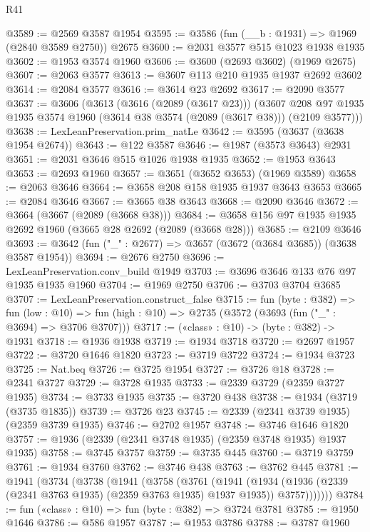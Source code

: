 \begin{lexlean}{R41}
\begin{coremodule}
{{{{{{{{{{{{{{{{{{{{{{{{{{{{{{{{{{{{{{{{{{{{{{{{{{{{{{{{{{{{{{{{{{{{{{{{{{{{{{{{{{{{{{{@3589 := @2569 @3587 @1954
@3595 := @3586 (fun (__b : @1931) => @1969 (@2840 @3589 @2750)) @2675
@3600 := @2031 @3577 @515 @1023 @1938 @1935
@3602 := @1953 @3574 @1960
@3606 := @3600 (@2693 @3602) (@1969 @2675)
@3607 := @2063 @3577
@3613 := @3607 @113 @210 @1935 @1937 @2692 @3602
@3614 := @2084 @3577
@3616 := @3614 @23 @2692
@3617 := @2090 @3577
@3637 := @3606
    (@3613
      (@3616 (@2089 (@3617 @23)))
      (@3607 @208 @97 @1935 @1935 @3574 @1960 (@3614 @38 @3574 (@2089 (@3617 @38))) (@2109 @3577)))
@3638 := LexLeanPreservation.prim_natLe
@3642 := @3595 (@3637 (@3638 @1954 @2674))
@3643 := @122 @3587
@3646 := @1987 (@3573 @3643) @2931
@3651 := @2031 @3646 @515 @1026 @1938 @1935
@3652 := @1953 @3643
@3653 := @2693 @1960
@3657 := @3651 (@3652 @3653) (@1969 @3589)
@3658 := @2063 @3646
@3664 := @3658 @208 @158 @1935 @1937 @3643 @3653
@3665 := @2084 @3646
@3667 := @3665 @38 @3643
@3668 := @2090 @3646
@3672 := @3664 (@3667 (@2089 (@3668 @38)))
@3684 := @3658 @156 @97 @1935 @1935 @2692 @1960 (@3665 @28 @2692 (@2089 (@3668 @28)))
@3685 := @2109 @3646
@3693 := @3642 (fun ("_" : @2677) => @3657 (@3672 (@3684 @3685)) (@3638 @3587 @1954))
@3694 := @2676 @2750
@3696 := LexLeanPreservation.conv_build @1949
@3703 := @3696 @3646 @133 @76 @97 @1935 @1935 @1960
@3704 := @1969 @2750
@3706 := @3703 @3704 @3685
@3707 := LexLeanPreservation.construct_false
@3715 := fun (byte : @382) =>
  fun (low : @10) => fun (high : @10) => @2735 (@3572 (@3693 (fun ("_" : @3694) => @3706 @3707)))
@3717 := («class» : @10) -> (byte : @382) -> @1931
@3718 := @1936 @1938
@3719 := @1934 @3718
@3720 := @2697 @1957
@3722 := @3720 @1646 @1820
@3723 := @3719 @3722
@3724 := @1934 @3723
@3725 := Nat.beq
@3726 := @3725 @1954
@3727 := @3726 @18
@3728 := @2341 @3727
@3729 := @3728 @1935
@3733 := @2339 @3729 (@2359 @3727 @1935)
@3734 := @3733 @1935
@3735 := @3720 @438
@3738 := @1934 (@3719 (@3735 @1835))
@3739 := @3726 @23
@3745 := @2339 (@2341 @3739 @1935) (@2359 @3739 @1935)
@3746 := @2702 @1957
@3748 := @3746 @1646 @1820
@3757 := @1936 (@2339 (@2341 @3748 @1935) (@2359 @3748 @1935) @1937 @1935)
@3758 := @3745 @3757
@3759 := @3735 @445
@3760 := @3719 @3759
@3761 := @1934 @3760
@3762 := @3746 @438
@3763 := @3762 @445
@3781 := @1941
    (@3734
      (@3738
        (@1941
          (@3758
            (@3761
              (@1941
                (@1934
                  (@1936 (@2339 (@2341 @3763 @1935) (@2359 @3763 @1935) @1937 @1935))
                  @3757)))))))
@3784 := fun («class» : @10) => fun (byte : @382) => @3724 @3781
@3785 := @1950 @1646
@3786 := @586 @1957
@3787 := @1953 @3786
@3788 := @3787 @1960
}}}}}}}}}}}}}}}}}}}}}}}}}}}}}}}}}}}}}}}}}}}}}}}}}}}}}}}}}}}}}}}}}}}}}}}}}}}}}}}}}}}}}}}
\end{coremodule}
\end{lexlean}
